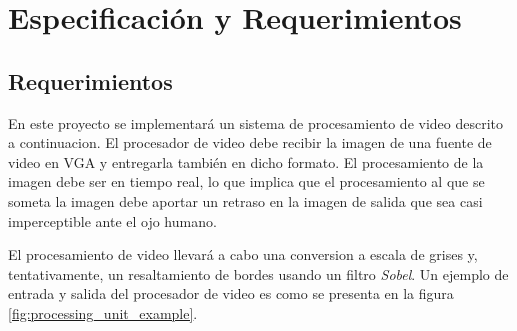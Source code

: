 \documentclass[10pt, letterpaper, conference]{IEEEtran}
\begin{document}
\section{Especificaci\'on y Requerimientos}
\label{sec:req}

\subsection{Requerimientos}

En este proyecto se implementar\'a un sistema de procesamiento de
video descrito a continuacion.  El procesador de video debe recibir la
imagen de una fuente de video en VGA y entregarla tambi\'en en dicho
formato. El procesamiento de la imagen debe ser en tiempo real, lo que
implica que el procesamiento al que se someta la imagen debe aportar
un retraso en la imagen de salida que sea casi imperceptible ante el
ojo humano.

El procesamiento de video llevar\'a a cabo una conversion a escala de
grises y, tentativamente, un resaltamiento de bordes usando un filtro
\emph{Sobel}.  Un ejemplo de entrada y salida del procesador de video
es como se presenta en la figura \ref{fig:processing_unit_example}.
\end{document}
